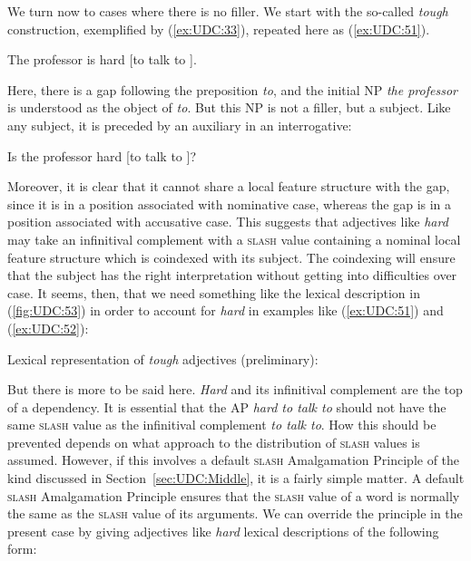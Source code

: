 \documentclass[output=paper
,notxmath 
	        ,collection
	        ,collectionchapter
 	        ,biblatex
                ,babelshorthands
                ,newtxmath
                ,draftmode
                ,colorlinks, citecolor=brown
]{langscibook}
\begin{document}
We turn now to cases where there is no filler. We start with the
so-called \emph{tough} construction, exemplified by (\ref{ex:UDC:33}), repeated here as
(\ref{ex:UDC:51}).

\begin{exe}
\ex \label{ex:UDC:51}
The professor is hard [to talk to \trace{}].
\end{exe}

\noindent
Here, there is a gap following the preposition \emph{to}, and the
initial NP \emph{the professor} is understood as the object of
\emph{to}. But this NP is not a filler, but a subject. Like any subject,
it is preceded by an auxiliary in an interrogative:

\begin{exe}
\ex \label{ex:UDC:52}
 Is the professor hard [to talk to \trace{}]?
\end{exe}
 
\noindent
Moreover, it is clear that it cannot share a local feature structure
with the gap, since it is in a position associated with nominative case,
whereas the gap is in a position associated with accusative case. This
suggests that adjectives like \emph{hard} may take an infinitival
complement with a \textsc{slash} value containing a nominal local feature
structure which is coindexed with its subject. The coindexing will
ensure that the subject has the right interpretation without getting
into difficulties over case. It seems, then, that we need something like
the lexical description in (\ref{fig:UDC:53}) in order to account for \emph{hard} in examples like (\ref{ex:UDC:51})
and (\ref{ex:UDC:52}):
  
\ea
\label{fig:UDC:53}
Lexical representation of \textit{tough} adjectives (preliminary):\\
\z

\noindent
But there is more to be said here. \emph{Hard} and its infinitival
complement are the top of a dependency. It is essential that the AP
\emph{hard to talk to} should not have the same \textsc{slash} value
as the infinitival complement \emph{to talk to}. How this should be
prevented depends on what approach to the distribution of
\textsc{slash} values is assumed.  However, if this involves a default
\textsc{slash} Amalgamation Principle of the kind discussed in
Section~\ref{sec:UDC:Middle}, it is a fairly simple matter. A default
\textsc{slash} Amalgamation Principle ensures that the \textsc{slash}
value of a word is normally the same as the \textsc{slash} value of
its arguments. We can override the principle in the present case by
giving adjectives like \emph{hard} lexical descriptions of the
following form:
\end{document}
